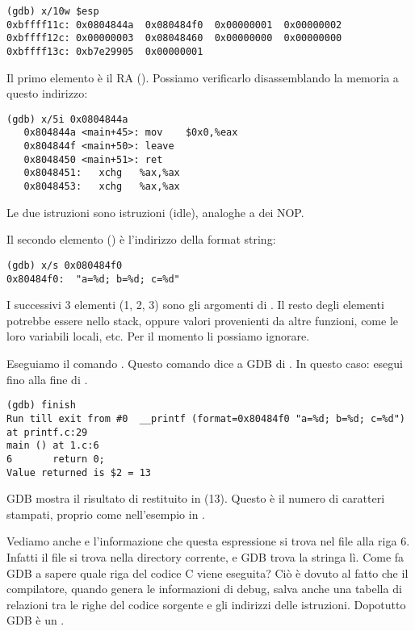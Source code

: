 \begin{lstlisting}
(gdb) x/10w $esp
0xbffff11c:	0x0804844a	0x080484f0	0x00000001	0x00000002
0xbffff12c:	0x00000003	0x08048460	0x00000000	0x00000000
0xbffff13c:	0xb7e29905	0x00000001
\end{lstlisting}

Il primo elemento è il \ac{RA} ().
Possiamo verificarlo disassemblando la memoria a questo indirizzo:

\begin{lstlisting}[label=NOP_as_XCHG_example,style=customasmx86]
(gdb) x/5i 0x0804844a
   0x804844a <main+45>:	mov    $0x0,%eax
   0x804844f <main+50>:	leave
   0x8048450 <main+51>:	ret
   0x8048451:	xchg   %ax,%ax
   0x8048453:	xchg   %ax,%ax
\end{lstlisting}

Le due istruzioni  sono istruzioni  (idle), analoghe a dei \ac{NOP}.

Il secondo elemento () è l'indirizzo della format string:

\begin{lstlisting}
(gdb) x/s 0x080484f0
0x80484f0:	"a=%d; b=%d; c=%d"
\end{lstlisting}

I successivi 3 elementi (1, 2, 3) sono gli argomenti di \printf.
Il resto degli elementi potrebbe essere  nello stack,
oppure valori provenienti da altre funzioni, come le loro variabili locali, etc.
Per il momento li possiamo ignorare.

Eseguiamo il comando .
Questo comando dice a GDB di .
In questo caso: esegui fino alla fine di \printf.

\begin{lstlisting}
(gdb) finish
Run till exit from #0  __printf (format=0x80484f0 "a=%d; b=%d; c=%d") at printf.c:29
main () at 1.c:6
6		return 0;
Value returned is $2 = 13
\end{lstlisting}

\ac{GDB} mostra il risultato di \printf restituito in \EAX (13).
Questo è il numero di caratteri stampati, proprio come nell'esempio in \olly.

Vediamo anche  e l'informazione che questa espressione si trova nel file  alla riga 6.
Infatti il file  si trova nella directory corrente, e \ac{GDB} trova la stringa lì.
Come fa \ac{GDB} a sapere quale riga del codice C viene eseguita?
Ciò è dovuto al fatto che il compilatore,
quando genera le informazioni di debug, salva anche una tabella di relazioni tra le righe del
codice sorgente e gli indirizzi delle istruzioni.
Dopotutto GDB è un .

